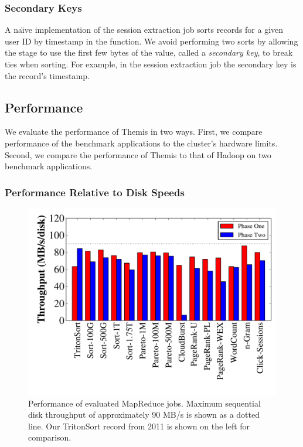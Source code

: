 \subsubsection{Secondary Keys}

A na\"{\i}ve implementation of the session extraction job sorts records for a
given user ID by timestamp in the \reduce function. We avoid performing two
sorts by allowing the \Sorter stage to use the first few bytes of the value,
called a \emph{secondary key}, to break ties when sorting. For example, in the
session extraction job the secondary key is the record's timestamp.

\subsection{Performance}

We evaluate the performance of Themis in two ways. First, we compare
performance of the benchmark applications to the cluster's hardware
limits. Second, we compare the performance of Themis to that of Hadoop on two
benchmark applications.

\subsubsection{Performance Relative to Disk Speeds}

\begin{figure}
\includegraphics[width=\columnwidth]{themis/graphs/performance.pdf}
\caption{\label{fig:performance} Performance of evaluated MapReduce
  jobs. Maximum sequential disk throughput of approximately 90 MB/s is shown as
  a dotted line. Our TritonSort record from 2011 is shown on the left for
  comparison.}
\end{figure}

